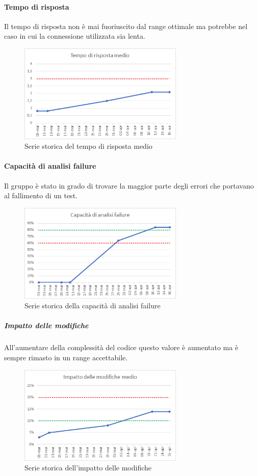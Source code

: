    \paragraph{Tempo di risposta} \Spazio
    Il tempo di risposta non è mai fuoriuscito dal range ottimale ma potrebbe nel caso in cui la connessione utilizzata sia lenta.
    \begin{figure}[H]
    	\centering 
    	\includegraphics[width=0.7\textwidth]{Images/risposta.png}
    	\caption{Serie storica del tempo di risposta medio}
    	\label{risposta} 
    \end{figure}
    \paragraph{Capacità di analisi failure} \Spazio
    Il gruppo è stato in grado di trovare la maggior parte degli errori che portavano al fallimento di un test.
    \begin{figure}[H]
    	\centering 
    	\includegraphics[width=0.7\textwidth]{Images/cap.png}
    	\caption{Serie storica della capacità di analisi failure}
    	\label{cap} 
    \end{figure}
     \subparagraph{Impatto delle modifiche} \Spazio
    All'aumentare della complessità del codice questo valore è aumentato ma è sempre rimasto in un range accettabile.
    \begin{figure}[H]
    	\centering 
    	\includegraphics[width=0.7\textwidth]{Images/modifiche.png}
    	\caption{Serie storica dell'impatto delle modifiche}
    	\label{modifiche} 
    \end{figure}
